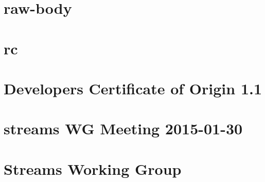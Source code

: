 \let\mypdfximage\pdfximage\def\pdfximage{\immediate\mypdfximage}\documentclass[twoside]{book}
\newcommand{\+}{\discretionary{\mbox{\scriptsize$\hookleftarrow$}}{}{}}
\begin{document}
\chapter{raw-\/body}
\label{md__c_1__git_hub__p_r_o_y_e_c_t_o-_i_i_i-_g_o_t_rest-api_node_modules_raw-body__r_e_a_d_m_e}

\chapter{rc}
\label{md__c_1__git_hub__p_r_o_y_e_c_t_o-_i_i_i-_g_o_t_rest-api_node_modules_rc__r_e_a_d_m_e}

\chapter{Developer\textquotesingle{}s Certificate of Origin 1.1}
\label{md__c_1__git_hub__p_r_o_y_e_c_t_o-_i_i_i-_g_o_t_rest-api_node_modules_readable-stream__c_o_n_t_r_i_b_u_t_i_n_g}

\chapter{streams WG Meeting 2015-\/01-\/30}
\label{md__c_1__git_hub__p_r_o_y_e_c_t_o-_i_i_i-_g_o_t_rest-api_node_modules_readable-stream_doc_wg-meetings_2015-01-30}

\chapter{Streams Working Group}
\label{md__c_1__git_hub__p_r_o_y_e_c_t_o-_i_i_i-_g_o_t_rest-api_node_modules_readable-stream__g_o_v_e_r_n_a_n_c_e}

\end{document}
